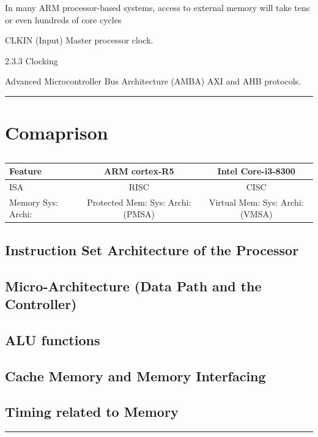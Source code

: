 \documentclass[a4paper,11pt]{article}
\begin{document}
In many ARM
processor-based systems, access to external memory will take tens or even hundreds of core cycles


CLKIN (Input) Master processor clock.

2.3.3 Clocking

Advanced Microcontroller Bus Architecture (AMBA) AXI and AHB protocols.



\vspace{1cm}\hrule
\section{Comaprison}
\begin{table}[!h]
	\centering
	\begin{tabular}{l ||c| c }
		\textbf{Feature} &\textbf{ARM cortex-R5}&\textbf{Intel Core-i3-8300}\\\hline
		ISA &RISC&CISC\\
		Memory Sys: Archi:&Protected Mem: Sys: Archi:(PMSA)&Virtual Mem: Sys: Archi:(VMSA)\\
		\hline\hline
	\end{tabular}
	\caption{}
\end{table}

\subsection{Instruction Set Architecture of the Processor}
\subsection{Micro-Architecture (Data Path and the Controller)}
\subsection{ALU functions}
\subsection{Cache Memory and Memory Interfacing}
\subsection{Timing related to Memory}
\vspace{1cm}\hrule

\footnotesize

\end{document}
